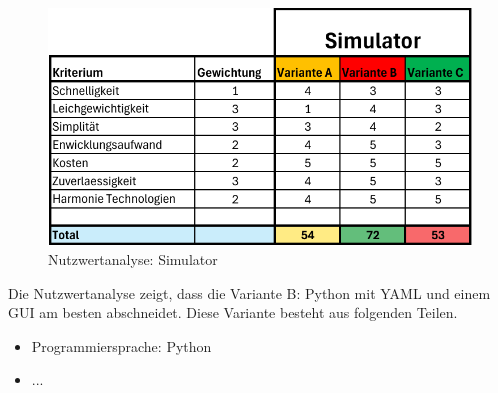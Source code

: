 \begin{figure}[H]
\centering
\includegraphics[width=\textwidth]{assets/Nutzwertanalyse-Simulator.pdf}
\caption{Nutzwertanalyse: Simulator}
\label{fig:nutzwert-simulator}
\end{figure}

Die Nutzwertanalyse zeigt, dass die Variante B: Python mit YAML und einem GUI am besten abschneidet. Diese Variante besteht aus folgenden Teilen.

\begin{itemize}
    \item Programmiersprache: Python
    \item ...
\end{itemize}